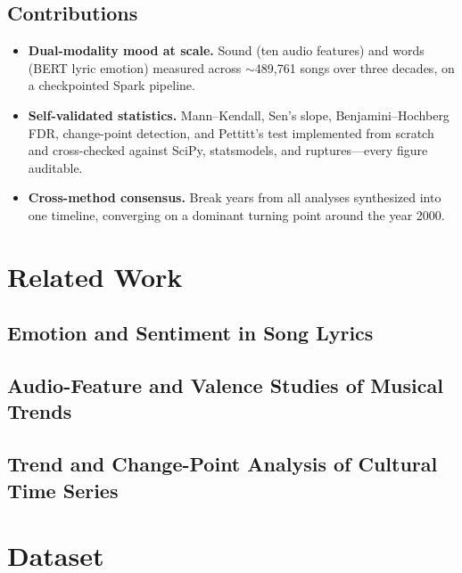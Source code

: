 \documentclass[conference]{IEEEtran}
\begin{document}
\subsection{Contributions}
\begin{itemize}
  \item \textbf{Dual-modality mood at scale.} Sound (ten audio features) and
        words (BERT lyric emotion) measured across $\sim$489{,}761 songs over
        three decades, on a checkpointed Spark pipeline.
  \item \textbf{Self-validated statistics.} Mann--Kendall, Sen's slope,
        Benjamini--Hochberg FDR, change-point detection, and Pettitt's test
        implemented from scratch and cross-checked against SciPy, statsmodels,
        and ruptures---every figure auditable.
  \item \textbf{Cross-method consensus.} Break years from all analyses
        synthesized into one timeline, converging on a dominant turning point
        around the year 2000.
\end{itemize}

\section{Related Work}

\subsection{Emotion and Sentiment in Song Lyrics}

\subsection{Audio-Feature and Valence Studies of Musical Trends}

\subsection{Trend and Change-Point Analysis of Cultural Time Series}

\section{Dataset}
\label{sec:dataset}
\end{document}
